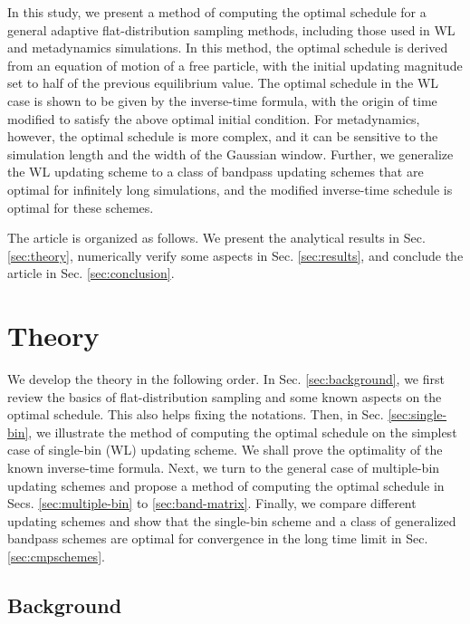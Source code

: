 \documentclass[reprint, floatfix]{revtex4-1}
\begin{document}
In this study,
we present a method of computing
the optimal schedule
for a general adaptive flat-distribution sampling methods,
including those used in WL and metadynamics simulations.
%
In this method, the optimal schedule is derived
from an equation of motion of a free particle,
with the initial updating magnitude set to
half of the previous equilibrium value.
%
The optimal schedule in the WL case
is shown to be given by
the inverse-time formula,
with the origin of time modified
to satisfy the above optimal initial condition.
%
For metadynamics, however,
the optimal schedule is more complex,
and it can be sensitive to the simulation length
and the width of the Gaussian window.
%
Further, we generalize
the WL updating scheme
to a class of bandpass updating schemes
that are optimal for infinitely long simulations,
and the modified inverse-time schedule is optimal for these schemes.
%



The article is organized as follows.
%
We present the analytical results in Sec. \ref{sec:theory},
numerically verify some aspects
in Sec. \ref{sec:results},
and conclude the article
in Sec. \ref{sec:conclusion}.




\section{\label{sec:theory}
Theory}



We develop the theory
in the following order.
%
In Sec. \ref{sec:background},
we first review the basics of
flat-distribution sampling
and some known aspects on the optimal schedule.
%
This also helps fixing the notations.
%
Then, in Sec. \ref{sec:single-bin},
we illustrate the method of
computing the optimal schedule
on the simplest case of
single-bin (WL) updating scheme.
%
We shall prove the optimality
of the known inverse-time formula.
%
Next, we turn to the general case
of multiple-bin updating schemes
and propose a method of computing
the optimal schedule
in Secs. \ref{sec:multiple-bin}
to \ref{sec:band-matrix}.
%
Finally, we compare different updating schemes
and show that the single-bin scheme
and a class of generalized bandpass schemes
are optimal for convergence
in the long time limit
in Sec. \ref{sec:cmpschemes}.



\subsection{\label{sec:background}
Background}
\end{document}
